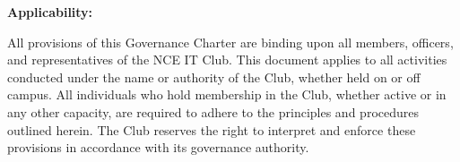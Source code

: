 \documentclass[12pt,a4paper]{article}
\newcounter{article}
\begin{document}
\noindent\textbf{Applicability:}

All provisions of this Governance Charter are binding upon all members, officers, and representatives of the NCE IT Club. This document applies to all activities conducted under the name or authority of the Club, whether held on or off campus. All individuals who hold membership in the Club, whether active or in any other capacity, are required to adhere to the principles and procedures outlined herein. The Club reserves the right to interpret and enforce these provisions in accordance with its governance authority.

\newpage
\tableofcontents
\newpage


\newpage

\newpage

\newpage

\newpage

\newpage

\newpage

\newpage

\newpage

\newpage

\newpage

\newpage

\end{document}
